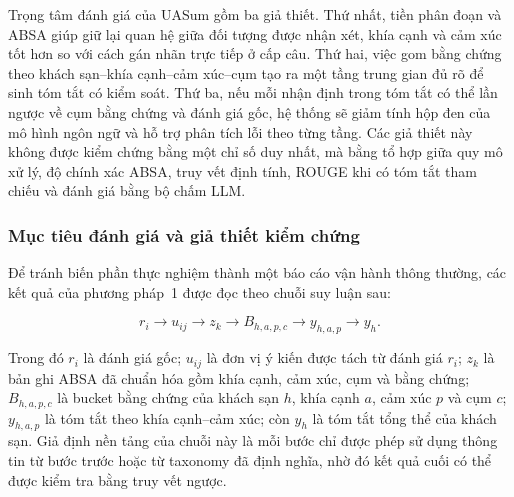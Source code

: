 Trọng tâm đánh giá của UASum gồm ba giả thiết. Thứ nhất, tiền phân đoạn và ABSA giúp giữ lại quan hệ giữa đối tượng được nhận xét, khía cạnh và cảm xúc tốt hơn so với cách gán nhãn trực tiếp ở cấp câu. Thứ hai, việc gom bằng chứng theo khách sạn--khía cạnh--cảm xúc--cụm tạo ra một tầng trung gian đủ rõ để sinh tóm tắt có kiểm soát. Thứ ba, nếu mỗi nhận định trong tóm tắt có thể lần ngược về cụm bằng chứng và đánh giá gốc, hệ thống sẽ giảm tính hộp đen của mô hình ngôn ngữ và hỗ trợ phân tích lỗi theo từng tầng. Các giả thiết này không được kiểm chứng bằng một chỉ số duy nhất, mà bằng tổ hợp giữa quy mô xử lý, độ chính xác ABSA, truy vết định tính, ROUGE khi có tóm tắt tham chiếu và đánh giá bằng bộ chấm LLM.

\subsubsection{Mục tiêu đánh giá và giả thiết kiểm chứng}
\label{subsubsec:method1-evaluation-objectives}

Để tránh biến phần thực nghiệm thành một báo cáo vận hành thông thường, các kết quả của phương pháp~1 được đọc theo chuỗi suy luận sau:

\begin{equation}
r_i
\rightarrow
u_{ij}
\rightarrow
z_k
\rightarrow
B_{h,a,p,c}
\rightarrow
y_{h,a,p}
\rightarrow
y_h.
\label{eq:method1-evaluation-chain}
\end{equation}

Trong đó $r_i$ là đánh giá gốc; $u_{ij}$ là đơn vị ý kiến được tách từ đánh giá $r_i$; $z_k$ là bản ghi ABSA đã chuẩn hóa gồm khía cạnh, cảm xúc, cụm và bằng chứng; $B_{h,a,p,c}$ là bucket bằng chứng của khách sạn $h$, khía cạnh $a$, cảm xúc $p$ và cụm $c$; $y_{h,a,p}$ là tóm tắt theo khía cạnh--cảm xúc; còn $y_h$ là tóm tắt tổng thể của khách sạn. Giả định nền tảng của chuỗi này là mỗi bước chỉ được phép sử dụng thông tin từ bước trước hoặc từ taxonomy đã định nghĩa, nhờ đó kết quả cuối có thể được kiểm tra bằng truy vết ngược.


